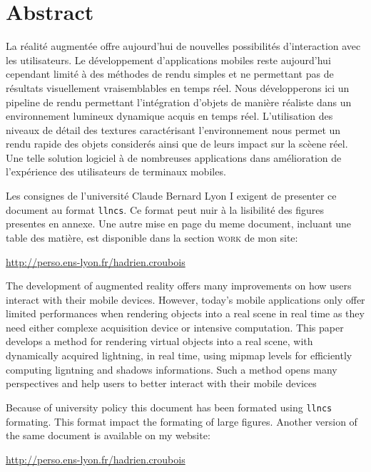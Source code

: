\documentclass[10pt,a4paper,twoside, twocolumn]{report}
\begin{document}
\vfill

{}
\section*{Abstract}


  \vfill
  
	La réalité augmentée offre aujourd'hui de nouvelles possibilités d’interaction avec les utilisateurs. Le développement d'applications mobiles reste aujourd'hui cependant limité à des méthodes de rendu simples et ne permettant pas de résultats visuellement vraisemblables en temps réel. Nous développerons ici un pipeline de rendu permettant l’intégration d'objets de manière réaliste dans un environnement lumineux dynamique acquis en temps réel. L'utilisation des niveaux de détail des textures caractérisant l'environnement nous permet un rendu rapide des objets considerés ainsi que de leurs impact sur la scèene réel. Une telle solution logiciel à de nombreuses applications dans amélioration de l’expérience des utilisateurs de terminaux mobiles.

	\ifllncs
	Les consignes de l'université Claude Bernard Lyon I exigent de presenter ce document au format \texttt{llncs}. Ce format peut nuir à la lisibilité des figures presentes en annexe. Une autre mise en page du meme document, incluant une table des matière, est disponible dans la section \textsc{work} de mon site:

	\begin{center}\href{http://perso.ens-lyon.fr/hadrien.croubois}{http://perso.ens-lyon.fr/hadrien.croubois}\end{center}
	\fi

	\vspace{1cm}

	
	The development of augmented reality offers many improvements on how users interact with their mobile devices. However, today's mobile applications only offer limited performances when rendering objects into a real scene in real time as they need either complexe acquisition device or intensive computation. This paper develops a method for rendering virtual objects into a real scene, with dynamically acquired lightning, in real time, using mipmap levels for efficiently computing ligntning and shadows informations. Such a method opens many perspectives and help users to better interact with their mobile devices

	\ifllncs
	Because of university policy this document has been formated using \texttt{llncs} formating. This format impact the formating of large figures. Another version of the same document is available on my website:

	\begin{center}\href{http://perso.ens-lyon.fr/hadrien.croubois}{http://perso.ens-lyon.fr/hadrien.croubois}\end{center}
	\fi

  \vfill
\end{document}
